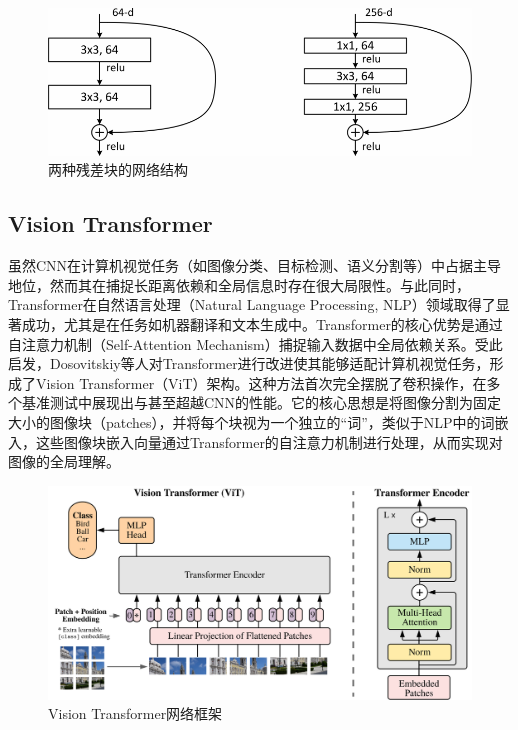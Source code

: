 \documentclass[lang=chs, degree=master, blindreview=false, adobe=false]{yanputhesis}
\begin{document}
\begin{figure}[htb]
  \centering
  \includegraphics[scale=0.55]{images/res-block.png}
  \caption{
    两种残差块的网络结构\cite{He2015ResNet}
  }
  \label{fig:resblock}
\end{figure}

\subsection{Vision Transformer}
虽然CNN在计算机视觉任务（如图像分类、目标检测、语义分割等）中占据主导地位，然而其在捕捉长距离依赖和全局信息时存在很大局限性。与此同时，Transformer在自然语言处理（Natural Language Processing, NLP）领域取得了显著成功，尤其是在任务如机器翻译和文本生成中。Transformer的核心优势是通过自注意力机制（Self-Attention Mechanism）捕捉输入数据中全局依赖关系。受此启发，Dosovitskiy等人\cite{dosovitskiy2020vit}对Transformer进行改进使其能够适配计算机视觉任务，形成了Vision Transformer（ViT）架构。这种方法首次完全摆脱了卷积操作，在多个基准测试中展现出与甚至超越CNN的性能。它的核心思想是将图像分割为固定大小的图像块（patches），并将每个块视为一个独立的“词”，类似于NLP中的词嵌入，这些图像块嵌入向量通过Transformer的自注意力机制进行处理，从而实现对图像的全局理解。
\begin{figure}[htb]
  \centering
  \includegraphics[scale=0.55]{images/ViT.png}
  \caption{
    Vision Transformer网络框架\cite{dosovitskiy2020vit}
  }
  \label{fig:ViT}
\end{figure}
\end{document}
